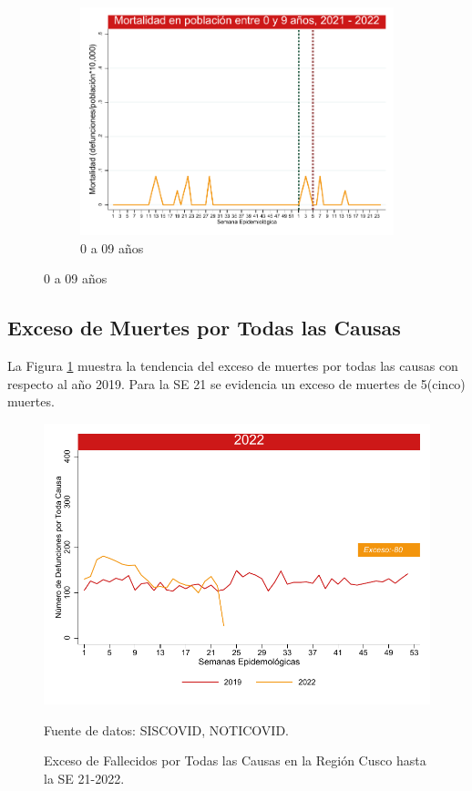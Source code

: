 \documentclass[12pt,a4paper,openany]{book}
\begin{document}
\begin{figure}[h]
		\vspace{10mm}
		\begin{subfigure}[b]{0.45\textwidth}
			\centering
			\includegraphics[width=\textwidth]{../figuras/mortalidad_edad_0.pdf}
			\caption{0 a 09 años}
		\end{subfigure}
	\end{figure}
	\clearpage	
	\subsection*{Exceso de Muertes por Todas las Causas}
	\noindent La Figura \ref{fig:exceso_regional} muestra la tendencia del exceso de muertes por todas las causas con respecto al año 2019. Para la SE 21 se evidencia un exceso de muertes de 5(cinco) muertes. 
	\begin{figure}[h]
		\caption{Exceso de Fallecidos por Todas las Causas en la Región Cusco hasta la SE 21-2022.}\label{fig:exceso_regional}
		\begin{center}
			\includegraphics[width=0.85\linewidth]{../figuras/exceso_region_2022.pdf}
		\end{center}
		{\footnotesize {Fuente de datos: SISCOVID, NOTICOVID.}}
	\end{figure}
	\clearpage
	
\end{document}

